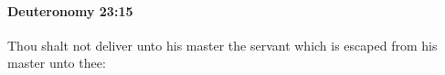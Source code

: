 
		\paragraph{Deuteronomy 23:15} %
			\label{DEUTERONOMY-23-15}

			Thou shalt not deliver unto his master the servant which is escaped from his master unto thee:


